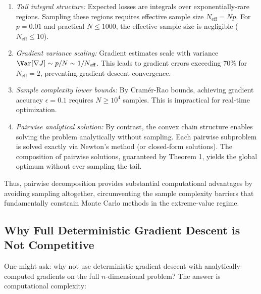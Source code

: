 \documentclass[12pt]{article}
\theoremstyle{definition}
\begin{document}
\begin{enumerate}
    \item \emph{Tail integral structure:} Expected losses are integrals over exponentially-rare regions. Sampling these regions requires effective sample size $N_{\text{eff}} = Np$. For $p=0.01$ and practical $N \leq 1000$, the effective sample size is negligible ($N_{\text{eff}} \leq 10$).

    \item \emph{Gradient variance scaling:} Gradient estimates scale with variance $\Var[\nabla J] \sim p/N \sim 1/N_{\text{eff}}$. This leads to gradient errors exceeding 70\% for $N_{\text{eff}} = 2$, preventing gradient descent convergence.

    \item \emph{Sample complexity lower bounds:} By Cramér-Rao bounds, achieving gradient accuracy $\epsilon = 0.1$ requires $N \geq 10^4$ samples. This is impractical for real-time optimization.

    \item \emph{Pairwise analytical solution:} By contrast, the convex chain structure enables solving the problem analytically without sampling. Each pairwise subproblem is solved exactly via Newton's method (or closed-form solutions). The composition of pairwise solutions, guaranteed by Theorem 1, yields the global optimum without ever sampling the tail.
\end{enumerate}

Thus, pairwise decomposition provides substantial computational advantages by avoiding sampling altogether, circumventing the sample complexity barriers that fundamentally constrain Monte Carlo methods in the extreme-value regime.

\subsection*{Why Full Deterministic Gradient Descent is Not Competitive}

One might ask: why not use deterministic gradient descent with analytically-computed gradients on the full $n$-dimensional problem? The answer is computational complexity:
\end{document}
